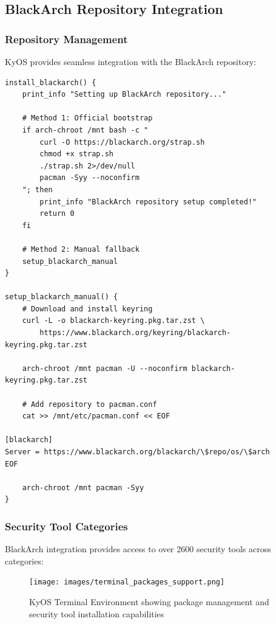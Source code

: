 \documentclass[12pt,a4paper]{article}
\begin{document}
\subsection{BlackArch Repository Integration}

\subsubsection{Repository Management}
KyOS provides seamless integration with the BlackArch repository:

\begin{lstlisting}[caption=BlackArch Repository Setup]
install_blackarch() {
    print_info "Setting up BlackArch repository..."
    
    # Method 1: Official bootstrap
    if arch-chroot /mnt bash -c "
        curl -O https://blackarch.org/strap.sh
        chmod +x strap.sh
        ./strap.sh 2>/dev/null
        pacman -Syy --noconfirm
    "; then
        print_info "BlackArch repository setup completed!"
        return 0
    fi
    
    # Method 2: Manual fallback
    setup_blackarch_manual
}

setup_blackarch_manual() {
    # Download and install keyring
    curl -L -o blackarch-keyring.pkg.tar.zst \
        https://www.blackarch.org/keyring/blackarch-keyring.pkg.tar.zst
    
    arch-chroot /mnt pacman -U --noconfirm blackarch-keyring.pkg.tar.zst
    
    # Add repository to pacman.conf
    cat >> /mnt/etc/pacman.conf << EOF

[blackarch]
Server = https://www.blackarch.org/blackarch/\$repo/os/\$arch
EOF
    
    arch-chroot /mnt pacman -Syy
}
\end{lstlisting}

\subsubsection{Security Tool Categories}
BlackArch integration provides access to over 2600 security tools across categories:

\begin{figure}[H]
\centering
\texttt{[image: images/terminal\_packages\_support.png]}
\caption{KyOS Terminal Environment showing package management and security tool installation capabilities}
\end{figure}
\end{document}
